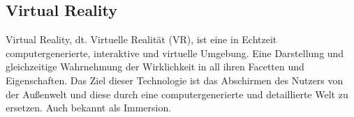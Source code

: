 \subsection*{Virtual Reality}
Virtual Reality, dt. Virtuelle Realität (\acs{VR}), ist eine in Echtzeit computergenerierte, interaktive und virtuelle Umgebung. Eine Darstellung 
und gleichzeitige Wahrnehmung der Wirklichkeit in all ihren Facetten und Eigenschaften. Das Ziel dieser Technologie ist das Abschirmen des Nutzers von der 
Außenwelt und diese durch eine computergenerierte und detaillierte Welt zu ersetzen. \cite{vr.2018n} Auch bekannt als Immersion.
